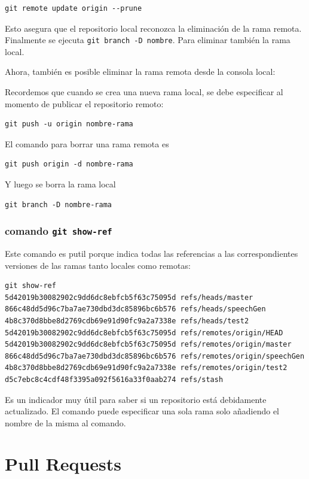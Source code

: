 \begin{verbatim}
git remote update origin --prune
\end{verbatim}
Esto asegura que el repositorio local reconozca la eliminación de la rama remota. Finalmente se ejecuta 
\texttt{git branch -D nombre}. Para eliminar también la rama local.

Ahora, también es posible eliminar la rama remota desde la consola local:

Recordemos que cuando se crea una nueva rama local, se debe especificar al momento de publicar el repositorio remoto:

\begin{verbatim}
git push -u origin nombre-rama
\end{verbatim}
El comando para borrar una rama remota es 

\begin{verbatim}
git push origin -d nombre-rama
\end{verbatim}
Y luego se borra la rama local

\begin{verbatim}
git branch -D nombre-rama
\end{verbatim}

\subsubsection{comando \texttt{git show-ref}} Este comando es putil porque indica todas las referencias a las correspondientes versiones de las ramas tanto locales como remotas:

\begin{verbatim}
git show-ref     
5d42019b30082902c9dd6dc8ebfcb5f63c75095d refs/heads/master
866c48dd5d96c7ba7ae730dbd3dc85896bc6b576 refs/heads/speechGen
4b8c370d8bbe8d2769cdb69e91d90fc9a2a7338e refs/heads/test2
5d42019b30082902c9dd6dc8ebfcb5f63c75095d refs/remotes/origin/HEAD
5d42019b30082902c9dd6dc8ebfcb5f63c75095d refs/remotes/origin/master
866c48dd5d96c7ba7ae730dbd3dc85896bc6b576 refs/remotes/origin/speechGen
4b8c370d8bbe8d2769cdb69e91d90fc9a2a7338e refs/remotes/origin/test2
d5c7ebc8c4cdf48f3395a092f5616a33f0aab274 refs/stash
\end{verbatim}

Es un indicador muy útil para saber si un repositorio está debidamente actualizado. El comando puede especificar una sola rama solo añadiendo el nombre de la misma al comando.

\section{Pull Requests}

